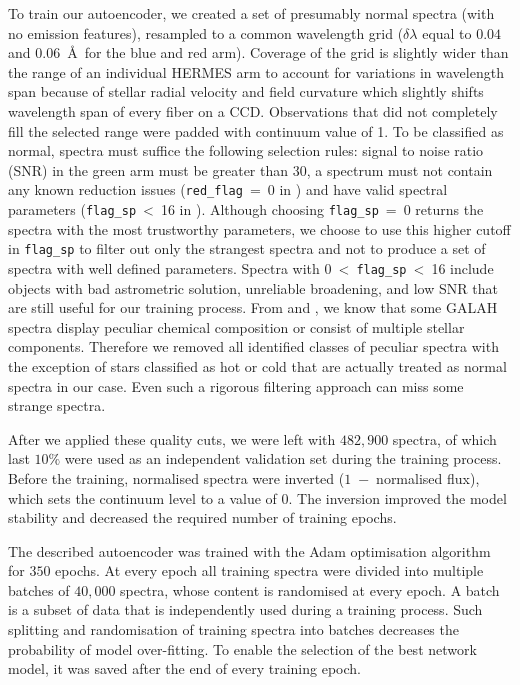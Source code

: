 To train our autoencoder, we created a set of presumably normal spectra (with no emission features), resampled to a common wavelength grid ($\delta \lambda$ equal to $0.04$ and $0.06$~\AA\ for the blue and red arm). Coverage of the grid is slightly wider than the range of an individual HERMES arm to account for variations in wavelength span because of stellar radial velocity and field curvature which slightly shifts wavelength span of every fiber on a CCD. Observations that did not completely fill the selected range were padded with continuum value of 1. To be classified as normal, spectra must suffice the following selection rules: signal to noise ratio (SNR) in the green arm must be greater than $30$, a spectrum must not contain any known reduction issues (\texttt{red\_flag}~=~0 in \citet{2017MNRAS.464.1259K}) and have valid spectral parameters (\texttt{flag\_sp}~<~16 in \citet{buder2020}). Although choosing \texttt{flag\_sp}~=~0 returns the spectra with the most trustworthy parameters, we choose to use this higher cutoff in \texttt{flag\_sp} to filter out only the strangest spectra and not to produce a set of spectra with well defined parameters. Spectra with 0~<~\texttt{flag\_sp}~<~16 include objects with bad astrometric solution, unreliable broadening, and low SNR that are still useful for our training process. From \citet{2017ApJS..228...24T, 2018MNRAS.478.4513B} and \citet{2019MNRAS.483.3196C}, we know that some GALAH spectra display peculiar chemical composition or consist of multiple stellar components. Therefore we removed all identified classes of peculiar spectra with the exception of stars classified as hot or cold that are actually treated as normal spectra in our case. Even such a rigorous filtering approach can miss some strange spectra.

After we applied these quality cuts, we were left with $482,900$ spectra, of which last $10\%$ were used as an independent validation set during the training process. Before the training, normalised spectra were inverted ($1$~$-$~normalised flux), which sets the continuum level to a value of $0$. The inversion improved the model stability and decreased the required number of training epochs.

The described autoencoder was trained with the Adam optimisation algorithm \cite{2014arXiv1412.6980K} for $350$ epochs. At every epoch all training spectra were divided into multiple batches of $40,000$ spectra, whose content is randomised at every epoch. A batch is a subset of data that is independently used during a training process. Such splitting and randomisation of training spectra into batches decreases the probability of model over-fitting. To enable the selection of the best network model, it was saved after the end of every training epoch. 

